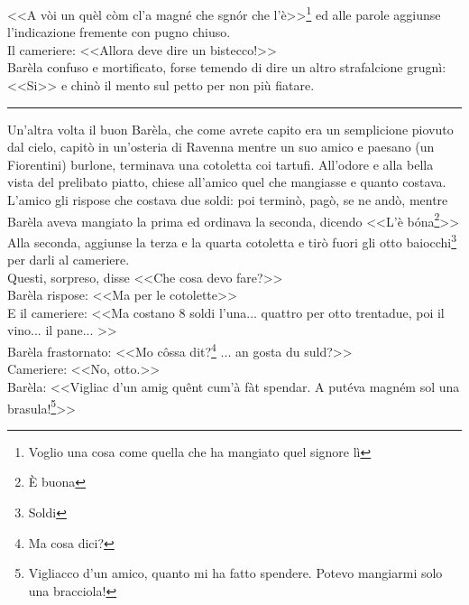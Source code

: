 \indent <<A vòi un quèl còm cl'a magné che sgnór che l'è>>\footnote{Voglio una cosa come quella che ha mangiato quel signore lì} ed alle parole aggiunse l'indicazione fremente con pugno chiuso.\\
\indent Il cameriere: <<Allora deve dire un bistecco!>>\\
Barèla confuso e mortificato, forse temendo di dire un altro strafalcione grugnì: <<Si>> e chinò il mento sul petto per non più fiatare.
\begin{center}
\rule{1.5cm}{0.4pt}
\end{center}
Un'altra volta il buon Barèla, che come avrete capito era un semplicione piovuto dal cielo, capitò in un'osteria di Ravenna mentre un suo amico e paesano (un Fiorentini) burlone, terminava una cotoletta coi tartufi. All'odore e alla bella vista del prelibato piatto, chiese all'amico quel che mangiasse e quanto costava. L'amico gli rispose che costava due soldi: poi terminò, pagò, se ne andò, mentre Barèla aveva mangiato la prima ed ordinava la seconda, dicendo <<L'è bóna\footnote{È buona}>>\\
Alla seconda, aggiunse la terza e la quarta cotoletta e tirò fuori gli otto baiocchi\footnote{Soldi} per darli al cameriere.\\
\indent Questi, sorpreso, disse <<Che cosa devo fare?>>\\
\indent {}Barèla rispose: <<Ma per le cotolette>>\\
\indent E il cameriere: <<Ma costano 8 soldi l'una... quattro per otto trentadue, poi il vino... il pane... >>\\
\indent {}Barèla frastornato: <<Mo côssa dit?\footnote{Ma cosa dici?} ... an gosta du suld?>>\\
\indent Cameriere: <<No, otto.>>\\
\indent {}Barèla: <<Vigliac d'un amig quênt cum'à fàt spendar. A putéva magném sol una brasula!\footnote{Vigliacco d'un amico, quanto mi ha fatto spendere. Potevo mangiarmi solo una bracciola!}>>






































%